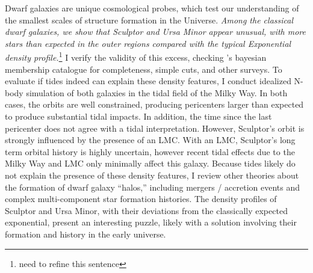 Dwarf galaxies are unique cosmological probes, which test our
understanding of the smallest scales of structure formation in the
Universe. \emph{Among the classical dwarf galaxies, we show that
Sculptor and Ursa Minor appear unusual, with more stars than expected in
the outer regions compared with the typical Exponential density
profile.}\footnote{need to refine this sentence} I verify the validity
of this excess, checking \citet{jensen+2024}'s bayesian membership
catalogue for completeness, simple cuts, and other surveys. To evaluate
if tides indeed can explain these density features, I conduct idealized
N-body simulation of both galaxies in the tidal field of the Milky Way.
In both cases, the orbits are well constrained, producing pericenters
larger than expected to produce substantial tidal impacts. In addition,
the time since the last pericenter does not agree with a tidal
interpretation. However, Sculptor's orbit is strongly influenced by the
presence of an LMC. With an LMC, Sculptor's long term orbital history is
highly uncertain, however recent tidal effects due to the Milky Way and
LMC only minimally affect this galaxy. Because tides likely do not
explain the presence of these density features, I review other theories
about the formation of dwarf galaxy ``halos,'' including mergers /
accretion events and complex multi-component star formation histories.
The density profiles of Sculptor and Ursa Minor, with their deviations
from the classically expected exponential, present an interesting
puzzle, likely with a solution involving their formation and history in
the early universe.

